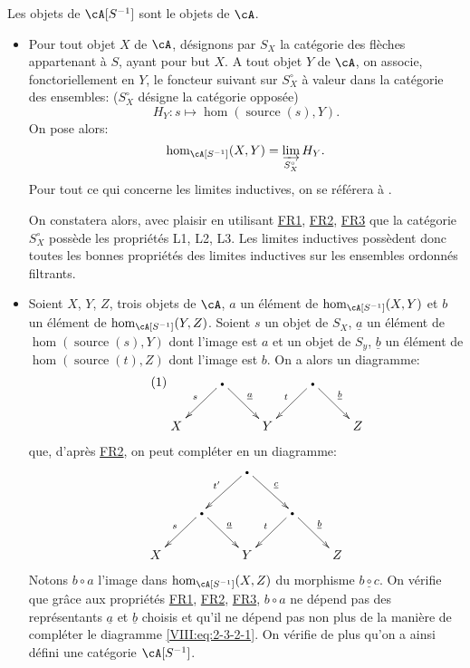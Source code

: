\subsubsection{}\label{VIII:2-3-2}

Les objets de $\cA[S^{-1}]$ sont le objets de $\cA$. 
\begin{itemize}
  \item Pour tout objet $X$ de $\cA$, désignons par $S_X$ la catégorie des 
    flèches appartenant à $S$, ayant pour but $X$. A tout objet $Y$ de 
    $\cA$, on associe, fonctoriellement en $Y$, le foncteur suivant sur 
    $S_X^\circ$ à valeur dans la catégorie des ensembles: 
    ($S_X^\circ$ désigne la catégorie opposée) 
    \[
      H_Y:s\mapsto \hom(\operatorname{source}(s),Y) \text{.}
    \]
    On pose alors: 
    \[
      \hom_{\cA[S^{-1}]}(X,Y) = \varinjlim_{S_X^\circ} H_Y \text{.}
    \]
    Pour tout ce qui concerne les limites inductives, on se référera à 
    \cite{ar62}. 
    
    On constatera alors, avec plaisir en utilisant \hyperlink{VIII:FR1}{FR1}, 
    \hyperlink{VIII:FR2}{FR2}, \hyperlink{VIII:FR3}{FR3} que la catégorie 
    $S_X^\circ$ possède les propriétés L1, L2, L3. Les limites inductives 
    possèdent donc toutes les bonnes propriétés des limites inductives 
    sur les ensembles ordonnés filtrants. 
  \item Soient $X$, $Y$, $Z$, trois objets de $\cA$, $a$ un élément de 
    $\hom_{\cA[S^{-1}]}(X,Y)$ et $b$ un élément de 
    $\hom_{\cA[S^{-1}]}(Y,Z)$. Soient $s$ un objet de $S_X$, $\underline a$ un 
    élément de $\hom(\operatorname{source}(s),Y)$ dont l'image est $a$ et 
    un objet de $S_y$, $\underline b$ un élément de 
    $\hom(\operatorname{source}(t),Z)$ dont l'image est $b$. On a alors un 
    diagramme: 
    \begin{equation*}\tag{1}\label{VIII:eq:2-3-2-1}
    \xymatrix{
      & \bullet \ar[dl]_-s \ar[dr]^-{\underline a} 
        & 
        & \bullet \ar[dl]_-t \ar[dr]^-{\underline b} \\
      X 
        & 
        & Y 
        & 
        & Z 
    }
    \end{equation*}
    que, d'après \hyperlink{VIII:FR2}{FR2}, on peut compléter en un 
    diagramme: 
    \[\xymatrix{
      & & \bullet \ar[dl]_-{t'} \ar[dr]^-{\underline c} \\
      & \bullet \ar[dl]_-s \ar[dr]^-{\underline a} 
        & & \bullet \ar[dl]_-t \ar[dr]^-{\underline b} \\
      X 
        & & Y 
        & & Z 
    }\]
    Notons $b\circ a$ l'image dans $\hom_{\cA[S^{-1}]}(X,Z)$ du morphisme 
    $\underline{b\circ c}$. On vérifie que gr\^ace aux propriétés 
    \hyperlink{VIII:FR1}{FR1}, \hyperlink{VIII:FR2}{FR2}, 
    \hyperlink{VIII:FR3}{FR3}, $b\circ a$ ne dépend pas des représentants 
    $\underline a$ et $\underline b$ choisis et qu'il ne dépend pas non plus 
    de la manière de compléter le diagramme \eqref{VIII:eq:2-3-2-1}. On 
    vérifie de plus qu'on a ainsi défini une catégorie $\cA[S^{-1}]$. 
\end{itemize}

